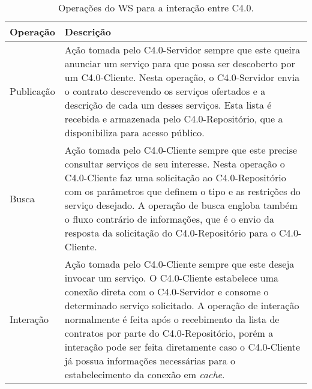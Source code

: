 \begin{table}[htb]
	\centering
	\caption{Operações do WS para a interação entre C4.0.}
	\label{tab:operacoes-ws}
	\begin{tabular}{p{3cm}p{12cm}}
		\hline
		\textbf{Operação}
		 & \textbf{Descrição}                                                                                                                                                                                                                                                                                                                                                                                                                                                \\

		\hline
		Publicação
		 & Ação tomada pelo C4.0-Servidor sempre que este queira anunciar um serviço para que possa ser descoberto por um C4.0-Cliente. Nesta operação, o C4.0-Servidor envia o contrato descrevendo os serviços ofertados e a descrição de cada um desses serviços. Esta lista é recebida e armazenada pelo C4.0-Repositório, que a disponibiliza para acesso público.                                                                                                      \\

		\hline
		Busca
		 & Ação tomada pelo C4.0-Cliente sempre que este precise consultar serviços de seu interesse. Nesta operação o C4.0-Cliente faz uma solicitação ao C4.0-Repositório com os parâmetros que definem o tipo e as restrições do serviço desejado. A operação de busca engloba também o fluxo contrário de informações, que é o envio da resposta da solicitação do C4.0-Repositório para o C4.0-Cliente.                                                                 \\

		\hline
		Interação
		 & Ação tomada pelo C4.0-Cliente sempre que este deseja invocar um serviço. O C4.0-Cliente estabelece uma conexão direta com o C4.0-Servidor e consome o determinado serviço solicitado. A operação de interação normalmente é feita após o recebimento da lista de contratos por parte do C4.0-Repositório, porém a interação pode ser feita diretamente caso o C4.0-Cliente já possua informações necessárias para o estabelecimento da conexão em \textit{cache}. \\

		\hline
	\end{tabular}
\end{table}

